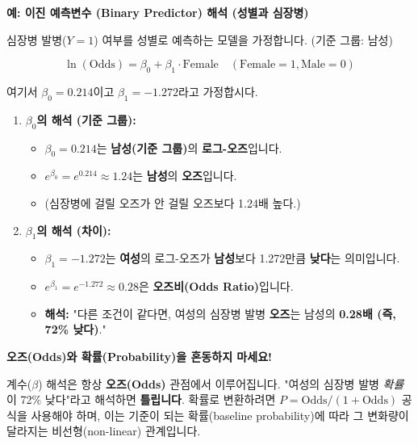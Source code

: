 \documentclass[11pt,a4paper]{book}
\theoremstyle{definition}
\begin{document}
\begin{examplebox}
  \textbf{예: 이진 예측변수 (Binary Predictor) 해석 (성별과 심장병)}

  심장병 발병($Y=1$) 여부를 성별로 예측하는 모델을 가정합니다.
  (기준 그룹: 남성)

  $$ \ln(\text{Odds}) = \beta_0 + \beta_1 \cdot \text{Female} \quad (\text{Female}=1, \text{Male}=0) $$

  여기서 $\beta_0 = 0.214$이고 $\beta_1 = -1.272$라고 가정합시다.

  \begin{enumerate}
    \item \textbf{$\beta_0$의 해석 (기준 그룹):}
        \begin{itemize}
          \item $\beta_0 = 0.214$는 \textbf{남성(기준 그룹)}의 \textbf{로그-오즈}입니다.
          \item $e^{\beta_0} = e^{0.214} \approx 1.24$는 \textbf{남성}의 \textbf{오즈}입니다.
          \item (심장병에 걸릴 오즈가 안 걸릴 오즈보다 1.24배 높다.)
        \end{itemize}

    \item \textbf{$\beta_1$의 해석 (차이):}
        \begin{itemize}
          \item $\beta_1 = -1.272$는 \textbf{여성}의 로그-오즈가 \textbf{남성}보다 1.272만큼 \textbf{낮다}는 의미입니다.
          \item $e^{\beta_1} = e^{-1.272} \approx 0.28$은 \textbf{오즈비(Odds Ratio)}입니다.
          \item \textbf{해석:} "다른 조건이 같다면, 여성의 심장병 발병 \textbf{오즈}는 남성의 \textbf{0.28배 (즉, 72\% 낮다)}."
        \end{itemize}
  \end{enumerate}
\end{examplebox}

\begin{warningbox}
  \textbf{오즈(Odds)와 확률(Probability)을 혼동하지 마세요!}

  계수($\beta$) 해석은 항상 \textbf{오즈(Odds)} 관점에서 이루어집니다.
  "여성의 심장병 발병 \textit{확률}이 72\% 낮다"라고 해석하면 \textbf{틀립니다}.
  확률로 변환하려면 $P = \text{Odds} / (1 + \text{Odds})$ 공식을 사용해야 하며,
  이는 기준이 되는 확률(baseline probability)에 따라 그 변화량이 달라지는 비선형(non-linear) 관계입니다.
\end{warningbox}
\end{document}
